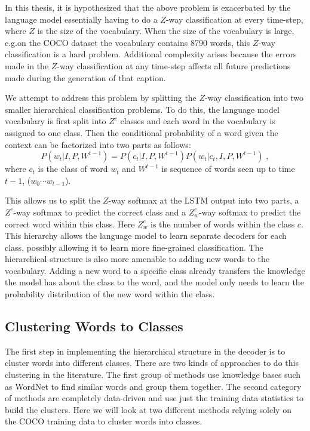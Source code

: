 In this thesis, it is hypothesized that the above problem is exacerbated by the
language model essentially having to do a $Z$-way classification at every
time-step, where $Z$ is the size of the vocabulary.
When the size of the vocabulary is large, e.g.\@ on the COCO dataset the vocabulary
contains 8790 words, this $Z$-way classification is a hard problem.
Additional complexity arises because the errors made in the $Z$-way
classification at any time-step affects all future predictions made during the
generation of that caption.

We attempt to address this problem by splitting the $Z$-way classification into
two smaller hierarchical classification problems.
To do this, the language model vocabulary is first split into $Z^c$ classes and
each word in the vocabulary is assigned to one class. 
Then the conditional probability of a word given the context can be factorized
into two parts as follows:
\begin{equation}
  \label{eq:class} 
  P(w_t | I,P, W^{t-1}) = P(c_t| I,P, W^{t-1}) P(w_t | c_t, I,P,W^{t-1}) \; ,
\end{equation}
\noindent where $c_t$ is the class of word $w_t$ and $W^{t-1}$ is sequence of words
seen up to time $t-1$, ($w_0\cdots w_{t-1}$).

This allows us to split the $Z$-way softmax at the LSTM output into two parts, a
$Z^c$-way softmax to predict the correct class and a $Z_w^c$-way softmax to
predict the correct word within this class.
Here $Z_w^c$ is the number of words within the class $c$.
This hierarchy allows the language model to learn separate decoders for each
class, possibly allowing it to learn more fine-grained classification.
The hierarchical structure is also more amenable to adding new words to the
vocabulary.
Adding a new word to a specific class already transfers the knowledge the model
has about the class to the word, and the model only needs to learn the
probability distribution of the new word within the class.

\subsection{Clustering Words to Classes}
The first step in implementing the hierarchical structure in the decoder is to
cluster words into different classes.
There are two kinds of approaches to do this clustering in the literature.
The first group of methods use knowledge bases such as WordNet to find similar
words and group them together.
The second category of methods are completely data-driven and use just the
training data statistics to build the clusters.
Here we will look at two different methods relying solely on the COCO training
data to cluster words into classes.

